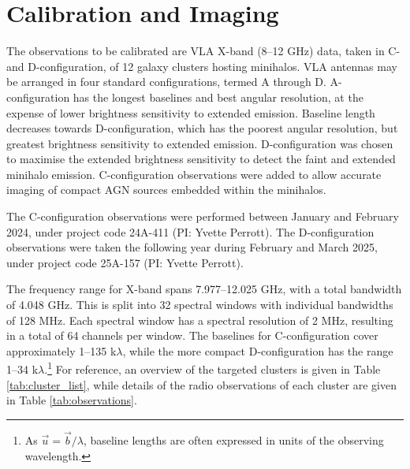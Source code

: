 \chapter[Calibration]{Calibration and Imaging}
\label{Chap:Calibration}

The observations to be calibrated are VLA X-band (8--12 GHz) data, taken in C- and D-configuration, of 12 galaxy clusters hosting minihalos. VLA antennas may be arranged in four standard configurations, termed A through D. A-configuration has the longest baselines and best angular resolution, at the expense of lower brightness sensitivity to extended emission. Baseline length decreases towards D-configuration, which has the poorest angular resolution, but greatest brightness sensitivity to extended emission. D-configuration was chosen to maximise the extended brightness sensitivity to detect the faint and extended minihalo emission. C-configuration observations were added to allow accurate imaging of compact AGN sources embedded within the minihalos.

The C-configuration observations were performed between January and February 2024, under project code 24A-411 (PI: Yvette Perrott). The D-configuration observations were taken the following year during February and March 2025, under project code 25A-157 (PI: Yvette Perrott). 

The frequency range for X-band spans 7.977--12.025 GHz, with a total bandwidth of 4.048 GHz. This is split into 32 spectral windows with individual bandwidths of 128 MHz. Each spectral window has a spectral resolution of 2 MHz, resulting in a total of 64 channels per window. The baselines for C-configuration cover approximately 1--135 k$\lambda$, while the more compact D-configuration has the range 1--34 k$\lambda$.\footnote{As $\vec u = \vec b / \lambda$, baseline lengths are often expressed in units of the observing wavelength.} For reference, an overview of the targeted clusters is given in Table \ref{tab:cluster_list}, while details of the radio observations of each cluster are given in Table \ref{tab:observations}.

